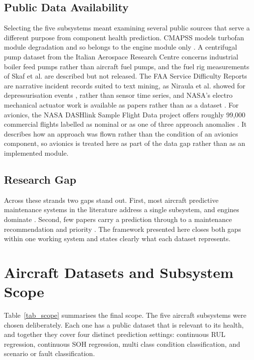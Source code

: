 \documentclass[conference]{IEEEtran}
\begin{document}
\subsection{Public Data Availability}
Selecting the five subsystems meant examining several public sources that serve a different purpose from component health prediction. CMAPSS models turbofan module degradation and so belongs to the engine module only \cite{b8}. A centrifugal pump dataset from the Italian Aerospace Research Centre concerns industrial boiler feed pumps rather than aircraft fuel pumps, and the fuel rig measurements of Skaf et al. \cite{b35} are described but not released. The FAA Service Difficulty Reports are narrative incident records suited to text mining, as Niraula et al. showed for depressurisation events \cite{b48}, rather than sensor time series, and NASA's electro mechanical actuator work is available as papers rather than as a dataset \cite{b46, b47}. For avionics, the NASA DASHlink Sample Flight Data project offers roughly 99,000 commercial flights labelled as nominal or as one of three approach anomalies \cite{b49}. It describes how an approach was flown rather than the condition of an avionics component, so avionics is treated here as part of the data gap rather than as an implemented module.

\subsection{Research Gap}
Across these strands two gaps stand out. First, most aircraft predictive maintenance systems in the literature address a single subsystem, and engines dominate \cite{b1}. Second, few papers carry a prediction through to a maintenance recommendation and priority \cite{b50}. The framework presented here closes both gaps within one working system and states clearly what each dataset represents.

\section{Aircraft Datasets and Subsystem Scope}
Table~\ref{tab_scope} summarises the final scope. The five aircraft subsystems were chosen deliberately. Each one has a public dataset that is relevant to its health, and together they cover four distinct prediction settings: continuous RUL regression, continuous SOH regression, multi class condition classification, and scenario or fault classification.
\end{document}
